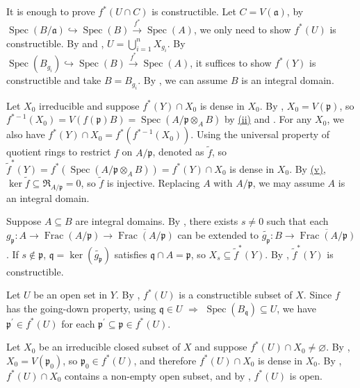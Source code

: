 \begin{exercise}\label{ex7.23}
	It is enough to prove $f^*(U\cap C)$ is constructible. Let $C=V(\mathfrak{a})$, by $\operatorname{Spec}(B/\mathfrak{a})\hookrightarrow\operatorname{Spec}(B)\xrightarrow{f^*}\operatorname{Spec}(A)$, we only need to show $f^*(U)$ is constructible. By  and , $U=\bigcup_{i=1}^nX_{g_i}$. By $\operatorname{Spec}\left(B_{g_i}\right)\hookrightarrow\operatorname{Spec}(B)\xrightarrow{f^*}\operatorname{Spec}(A)$, it suffices to show $f^*(Y)$ is constructible and take $B=B_{g_i}$. By , we can assume $B$ is an integral domain.
	
	Let $X_0$ irreducible and suppose $f^*(Y)\cap X_0$ is dense in $X_0$. By , $X_0=V(\mathfrak{p})$, so $f^{*-1}\left(X_0\right)=V(f(\mathfrak{p})B)=\operatorname{Spec}\left(A/\mathfrak{p}\otimes_AB\right)$ by \hyperref[ex1.21]{(ii)} and . For any $X_0$, we also have $f^*(Y)\cap X_0=f^*\left(f^{*-1}\left(X_0\right)\right)$. Using the universal property of quotient rings to restrict $f$ on $A/\mathfrak{p}$, denoted as $\tilde{f}$, so $\tilde{f}^*(Y)=f^*\left(\operatorname{Spec}\left(A/\mathfrak{p}\otimes_AB\right)\right)=f^*(Y)\cap X_0$ is dense in $X_0$. By \hyperref[ex1.21]{(v)},   $\ker\tilde{f}\subseteq\mathfrak{R}_{A/\mathfrak{p}}=0$, so $\tilde{f}$ is injective. Replacing $A$ with $A/\mathfrak{p}$, we may assume $A$ is an integral domain.
	
	Suppose $A\subseteq B$ are integral domains. By , there exists $s\neq0$ such that each $g_\mathfrak{p}:A\rightarrow\operatorname{Frac}(A/\mathfrak{p})\rightarrow\overline{\operatorname{Frac}(A/\mathfrak{p})}$ can be extended to $\tilde{g_\mathfrak{p}}:B\rightarrow\overline{\operatorname{Frac}(A/\mathfrak{p})}$. If $s\notin\mathfrak{p}$, $\mathfrak{q}=\ker\left(\tilde{g_\mathfrak{p}}\right)$ satisfies $\mathfrak{q}\cap A=\mathfrak{p}$, so $X_s\subseteq\tilde{f}^*(Y)$. By , $\tilde{f}^*(Y)$ is constructible.
\end{exercise}

\begin{exercise}\label{ex7.24}
	Let $U$ be an open set in $Y$. By , $f^*(U)$ is a constructible subset of $X$. Since $f$ has the going-down property, using $\mathfrak{q}\in U$ $\Rightarrow$ $\operatorname{Spec}(B_\mathfrak{q})\subseteq U$, we have $\mathfrak{p}^\prime\in f^*(U)$ for each $\mathfrak{p}^\prime\subseteq\mathfrak{p}\in f^*(U)$.

	Let $X_0$ be an irreducible closed subset of $X$ and suppose $f^*(U)\cap X_0\neq\varnothing$. By , $X_0=V\left(\mathfrak{p}_0\right)$, so $\mathfrak{p}_0\in f^*(U)$, and therefore $f^*(U)\cap X_0$ is dense in $X_0$. By , $f^*(U)\cap X_0$ contains a non-empty open subset, and by , $f^*(U)$ is open.
\end{exercise}

